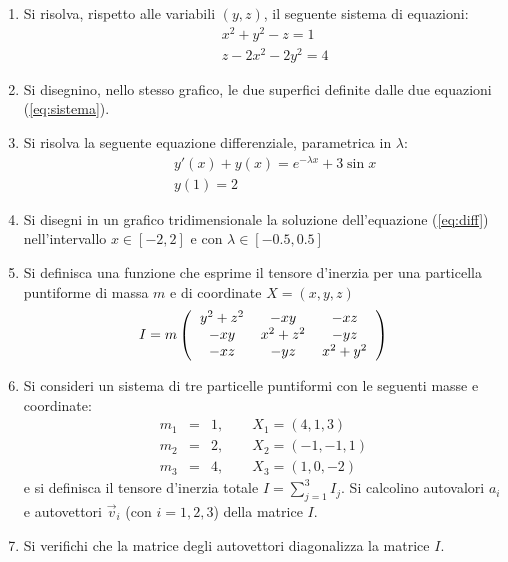 \documentclass[12pt,italian]{article}
\newcommand{\be}{\begin{equation}}
\newcommand{\ee}{\end{equation}}
\newcommand{\bea}{\begin{eqnarray}}
\newcommand{\eea}{\end{eqnarray}}
\begin{document}
\begin{enumerate}


\item
Si risolva, rispetto alle variabili $(y,z)$, il seguente sistema di equazioni:
\bea
&&x^2+y^2-z=1\nonumber\\
&&z-2 x^2-2 y^2=4
\label{eq:sistema}
\eea

\item
Si disegnino, nello stesso grafico, le due superfici definite dalle due equazioni (\ref{eq:sistema}).


\item
Si risolva la seguente equazione differenziale, parametrica in $\lambda$:
\bea
&&y'(x) + y(x) = e^{-\lambda x} + 3 \sin x\\
&&y(1)=2\nonumber
\label{eq:diff}
\eea

\item
Si disegni in un grafico tridimensionale la soluzione dell'equazione (\ref{eq:diff})
nell'intervallo $x\in [-2,2]$ e con $\lambda\in [-0.5,0.5]$

\item
Si definisca una funzione che esprime il tensore d'inerzia per una particella puntiforme di massa $m$ e di coordinate $X=(x,y,z)$
\be
I= m
\left( 
\begin{tabular}{ccc}
$y^2+z^2$ & $-x y$    & $-x z$ \\
$-x y$    & $x^2+z^2$ & $-y z$ \\
$-x z$    & $-y z$    & $x^2+y^2$
\end{tabular}  
\right)
\ee

\item
Si consideri un sistema di tre particelle puntiformi con le seguenti masse e coordinate:
\bea
m_1 &=& 1,\quad\quad X_1=(4,1,3)\nonumber\\
m_2 &=& 2,\quad\quad X_2=(-1,-1,1)\nonumber\\
m_3 &=& 4,\quad\quad X_3=(1,0,-2)
\eea
e si definisca il tensore d'inerzia totale $I=\sum_{j=1}^3 I_j$.
Si calcolino autovalori $a_i$ e autovettori $\vec v_i$ (con $i=1,2,3$) della matrice $I$.

\item
Si verifichi che la matrice degli autovettori diagonalizza la matrice $I$.



\end{enumerate}
\end{document}
